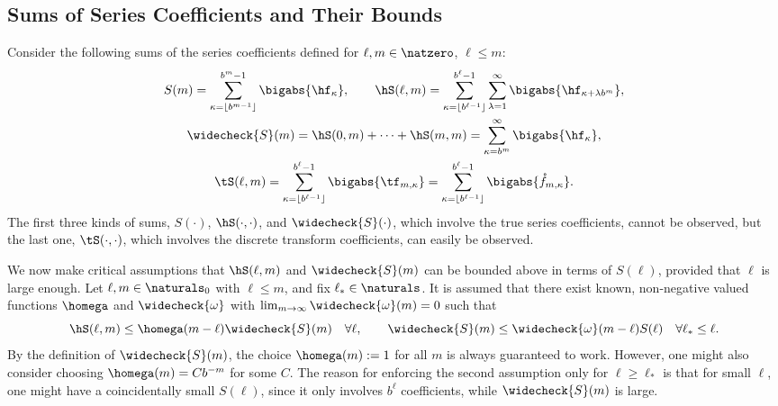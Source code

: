 \documentclass[]{elsarticle}
\theoremstyle{definition}
\newcommand{\rf}{\mathring{f}}
\newcommand{\wcS}{\widecheck{S}}
\newcommand{\wcomega}{\widecheck{\omega}}
\begin{document}
\subsection{Sums of Series Coefficients and Their Bounds}
Consider the following sums of the series coefficients defined for $\ell,m \in \natzero$, $\ell \le m$:
\begin{gather*}
S(m) =  \sum_{\kappa=\left \lfloor b^{m-1} \right \rfloor}^{b^{m}-1} \bigabs{\hf_{\kappa}}, \qquad
\hS(\ell,m)  = \sum_{\kappa=\left \lfloor b^{\ell-1} \right \rfloor}^{b^{\ell}-1} \sum_{\lambda=1}^{\infty} \bigabs{ \hf_{\kappa+\lambda b^{m}}}, \\
\wcS(m)=\hS(0,m) + \cdots + \hS(m,m)=
\sum_{\kappa=b^{m}}^{\infty} \bigabs{\hf_{\kappa}}, \\
\tS(\ell,m) = \sum_{\kappa=\left \lfloor b^{\ell-1}\right \rfloor}^{b^{\ell}-1} \bigabs{\tf_{m,\kappa}} = \sum_{\kappa=\left \lfloor b^{\ell-1}\right \rfloor}^{b^{\ell}-1} \bigabs{\rf_{m,\kappa}}.
\end{gather*}
The first three kinds of sums, $S(\cdot)$, $\hS(\cdot,\cdot)$, and $\wcS(\cdot)$, which involve the true series coefficients, cannot be observed, but the last one, $\tS(\cdot, \cdot)$, which involves the discrete transform coefficients, can easily be observed.

We now make critical assumptions that $\hS(\ell,m)$ and $\wcS(m)$ can be bounded above in terms of $S(\ell)$, provided that $\ell$ is large enough.  Let $\ell,m \in \naturals_0$ with $\ell \le m$, and fix $\ell_* \in \naturals$.  It is assumed that there exist known,  non-negative valued functions $\homega$ and $\wcomega$ with $\lim_{m \to \infty} \wcomega(m) = 0$ such that
\begin{equation} \label{conecond}
\hS(\ell,m) \le \homega(m-\ell) \wcS(m) \quad \forall \ell, \qquad
\wcS(m) \le \wcomega(m-\ell) S(\ell) \quad \forall \ell_* \le \ell.
\end{equation}
By the definition of $\wcS(m)$, the choice $\homega(m):=1$ for all $m$ is always guaranteed to work.  However, one might also consider choosing $\homega(m)=C b^{-m}$ for some $C$.  The reason for enforcing the second assumption only  for $\ell \ge \ell_*$ is that for small $\ell$, one might have a coincidentally small $S(\ell)$, since it only involves $b^\ell$ coefficients, while $\wcS(m)$ is large.
\end{document}
